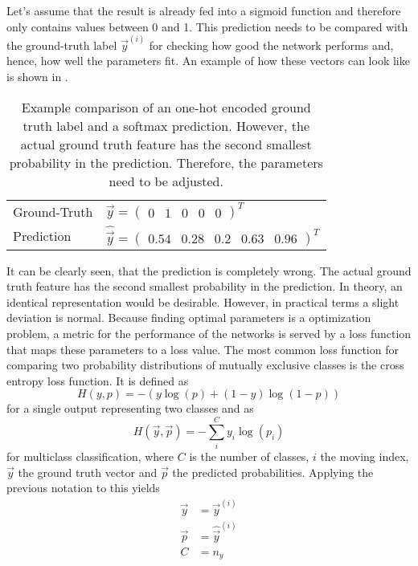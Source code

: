 Let's assume that the result is already fed into a sigmoid function and therefore only contains values between 0 and 1.
This prediction needs to be compared with the ground-truth label $\vec{y}^{(i)}$ for checking how good the network performs and, hence, how well the parameters fit.
An example of how these vectors can look like is shown in .
\begin{table}[]
	\centering
	\caption[Example Comparison of One-Hot Encoded Ground Truth Label and Prediction]{Example comparison of an one-hot encoded ground truth label and a softmax prediction. However, the actual ground truth feature has the second smallest probability in the prediction. Therefore, the parameters need to be adjusted.}
	\label{tab:prediction}
	\begin{tabular}{ll}
		Ground-Truth & $\vec{y} = \begin{pmatrix} 0 & 1 & 0 & 0 & 0 \end{pmatrix}^T$                     \\
		Prediction   & $\hat{\vec{y}} = \begin{pmatrix} 0.54 & 0.28 & 0.2 & 0.63 & 0.96 \end{pmatrix}^T$
	\end{tabular}
\end{table}
It can be clearly seen, that the prediction is completely wrong.
The actual ground truth feature has the second smallest probability in the prediction.
In theory, an identical representation would be desirable.
However, in practical terms a slight deviation is normal.
Because finding optimal parameters is a optimization problem, a metric for the performance of the networks is served by a loss function that maps these parameters to a loss value.
The most common loss function for comparing two probability distributions of mutually exclusive classes is the cross entropy loss function.
It is defined as
\begin{equation}
	H(y,p) = -(y \log(p) + (1-y) \log(1-p))
\end{equation}
for a single output representing two classes and as
\begin{equation}
	\label{eq:cross-entropy-loss}
	H(\vec{y}, \vec{p}) = - \sum_{i}^{C} y_i \log (p_i)
\end{equation}
for multiclass classification, where $C$ is the number of classes, $i$ the moving index, $\vec{y}$ the ground truth vector and $\vec{p}$ the predicted probabilities\cite{murphy2013machine}.
Applying the previous notation to this yields
\begin{subequations}
	\begin{align}
		\vec{y} &= \vec{y}^{(i)} \\
		\vec{p} &= \hat{\vec{y}}^{(i)} \\
		C &= n_y
	\end{align}
\end{subequations}
